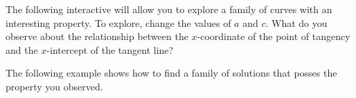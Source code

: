 \documentclass{ximera}
\begin{document}
\begin{example}
\begin{explanation}
\begin{center}
\end{center}

 
\end{explanation}
\end{example}

The following interactive will allow you to explore a family of curves with an interesting property.  To explore, change the values of $a$ and $c$.  What do you observe about the relationship between the $x$-coordinate of the point of tangency and the $x$-intercept of the tangent line?

\begin{center}  
\end{center}

 
The following example shows how to find a family of solutions that posses the property you observed. 
 
\end{document}
